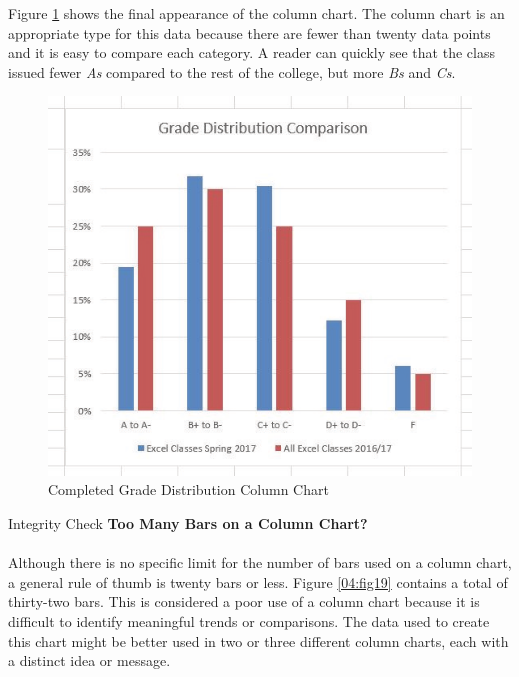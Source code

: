 Figure \ref{04:fig18} shows the final appearance of the column chart. The column chart is an appropriate type for this data because there are fewer than twenty data points and it is easy to compare each category. A reader can quickly see that the class issued fewer \textit{As} compared to the rest of the college, but more \textit{Bs} and \textit{Cs}.

\begin{figure}[H]
	\centering
	\includegraphics[width=\maxwidth{.95\linewidth}]{gfx/ch04_fig18}
	\caption{Completed Grade Distribution Column Chart}
	\label{04:fig18}
\end{figure}

\begin{center}
	\begin{infobox}{Integrity Check}
		\textbf{Too Many Bars on a Column Chart?}
		\\
		\\
		 Although there is no specific limit for the number of bars used on a column chart, a general rule of thumb is twenty bars or less. Figure \ref{04:fig19} contains a total of thirty-two bars. This is considered a poor use of a column chart because it is difficult to identify meaningful trends or comparisons. The data used to create this chart might be better used in two or three different column charts, each with a distinct idea or message.
	\end{infobox}
\end{center}

